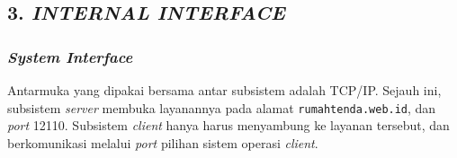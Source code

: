\subsection*{\textcolor{subsectioncolor}{\textsf{3. \textit{INTERNAL INTERFACE}}}}

\subsubsection*{\textit{System Interface}}
Antarmuka yang dipakai bersama antar subsistem adalah TCP/IP.
Sejauh ini,
subsistem \textit{server} membuka layanannya pada alamat \texttt{rumahtenda.web.id},
dan \textit{port} 12110.
Subsistem \textit{client} hanya harus menyambung ke layanan tersebut,
dan berkomunikasi melalui \textit{port} pilihan sistem operasi \textit{client}.

